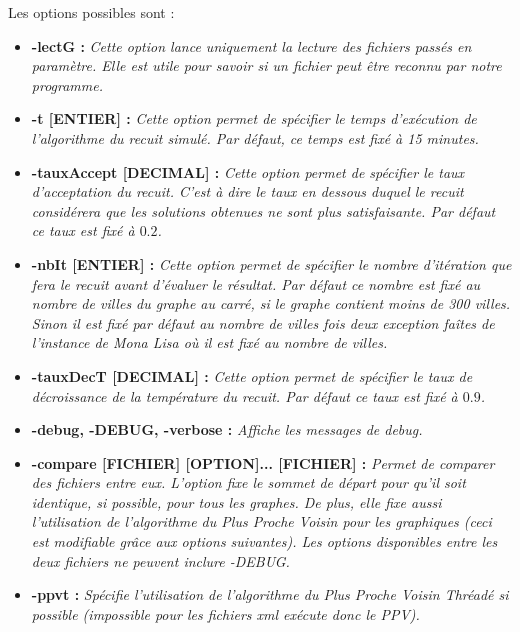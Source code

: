 \documentclass{article}
\begin{document}
Les options possibles sont :\smallskip
\begin{itemize}
\item \textbf{-lectG :} \emph{Cette option lance uniquement la lecture des fichiers passés en paramètre. Elle est utile pour savoir si un fichier peut être reconnu par notre programme.}\smallskip

\item \textbf{-t [ENTIER] :} \emph{Cette option permet de spécifier le temps d'exécution de l'algorithme du recuit simulé. Par défaut, ce temps est fixé à 15 minutes.}\smallskip

\item \textbf{-tauxAccept [DECIMAL] :} \emph{Cette option permet de spécifier le taux d'acceptation du recuit. C'est à dire le taux en dessous duquel le recuit considérera que les solutions obtenues ne sont plus satisfaisante. Par défaut ce taux est fixé à $0.2$.}\smallskip

\item \textbf{-nbIt [ENTIER] :} \emph{Cette option permet de spécifier le nombre d'itération que fera le recuit avant d'évaluer le résultat.
Par défaut ce nombre est fixé au nombre de villes du graphe au carré, si le graphe contient moins de 300 villes.
Sinon il est fixé par défaut au nombre de villes fois deux exception faîtes de l'instance de Mona Lisa où il est fixé au nombre de villes.}\smallskip

\item \textbf{-tauxDecT [DECIMAL] :} \emph{Cette option permet de spécifier le taux de décroissance de la température du recuit. Par défaut ce taux est fixé à $0.9$.}\smallskip

\item \textbf{-debug, -DEBUG, -verbose :} \emph{Affiche les messages de debug.}\smallskip

\item \textbf{-compare [FICHIER] [OPTION]... [FICHIER] :} \emph{
Permet de comparer des fichiers entre eux. L'option fixe le sommet de départ pour qu'il soit identique, si possible, pour tous les graphes.
De plus, elle fixe aussi l'utilisation de l'algorithme du Plus Proche Voisin pour les graphiques (ceci est modifiable grâce aux options suivantes).
Les options disponibles entre les deux fichiers ne peuvent inclure -DEBUG.}\smallskip

\item \textbf{-ppvt :} \emph{Spécifie l'utilisation de l'algorithme du Plus Proche Voisin Thréadé si possible (impossible pour les fichiers xml exécute donc le PPV).}\smallskip


\end{itemize}
\end{document}
